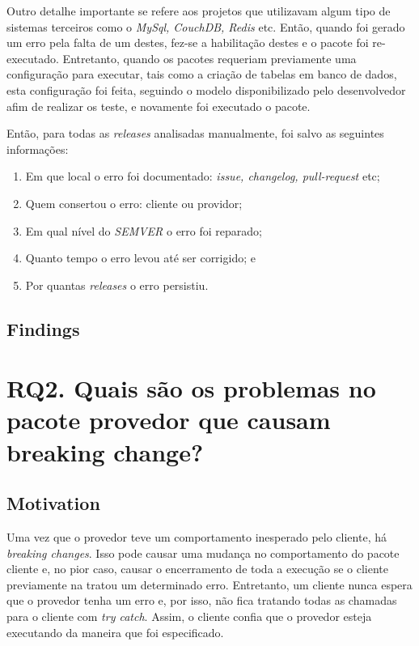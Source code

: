 Outro detalhe importante se refere aos projetos que utilizavam algum tipo de sistemas terceiros como o \textit{MySql, CouchDB, Redis} etc. Então, quando foi gerado um erro pela falta de um destes, fez-se a habilitação destes e o pacote foi re-executado. Entretanto, quando os pacotes requeriam previamente uma configuração para executar, tais como a criação de tabelas em banco de dados, esta configuração foi feita, seguindo o modelo disponibilizado pelo desenvolvedor afim de realizar os teste, e novamente foi executado o pacote.

Então, para todas as \textit{releases} analisadas manualmente, foi salvo as seguintes informações:

\begin{enumerate}
    \item Em que local o erro foi documentado: \textit{issue, changelog, pull-request} etc;
    \item Quem consertou o erro: cliente ou providor;
    \item Em qual nível do \textit{SEMVER} o erro foi reparado;
    \item Quanto tempo o erro levou até ser corrigido; e
    \item Por quantas \textit{releases} o erro persistiu.
\end{enumerate}{}

\subsection{Findings}
\label{fin:rq1}

\section{RQ2. Quais são os problemas no pacote provedor que causam breaking change?}
\label{sec:rq2}

\subsection{Motivation}
\label{mot:rq2}

Uma vez que o provedor teve um comportamento inesperado pelo cliente, há \textit{breaking changes}. Isso pode causar uma mudança no comportamento do pacote cliente e, no pior caso, causar o encerramento de toda a execução se o cliente previamente na tratou um determinado erro. Entretanto, um cliente nunca espera que o provedor tenha um erro e, por isso, não fica tratando todas as chamadas para o cliente com \textit{try catch}. Assim, o cliente confia que o provedor esteja executando da maneira que foi especificado.

